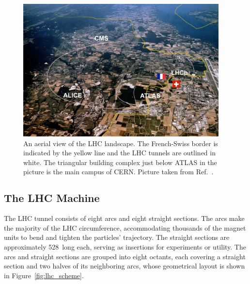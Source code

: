 \begin{figure}[!htb]
    \centering
    \includegraphics[width=0.95\textwidth]{pics/LHC_CMS/LHC_landscape.png}
    \caption{An aerial view of the LHC landscape. The French-Swiss border is indicated by the yellow line and the LHC tunnels are outlined in white.
             The triangular building complex just below ATLAS in the picture is the main campus of CERN.
             Picture taken from Ref.~\cite{aerial_lhc}.}
    \label{fig:lhc_landscape}
\end{figure}


\subsection{The LHC Machine}
The LHC tunnel consists of eight arcs and eight straight sections.
The arcs make the majority of the LHC circumference, accommodating thousands of the magnet units to bend and tighten the particles' trajectory.
The straight sections are approximately 528~\meter long each, serving as insertions for experiments or utility. 
The arcs and straight sections are grouped into eight octants, each covering a straight section and two halves of its neighboring arcs,
whose geometrical layout is shown in Figure~\ref{fig:lhc_scheme}. 

